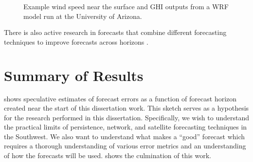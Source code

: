 \begin{figure}[htb]
\hspace{-.5em}
\caption[Wind speed and GHI output from UA-WRF]{Example wind speed
  near the surface and GHI outputs from a WRF model run at the
  University of Arizona.}
\label{fig:wrf}
\end{figure}

There is also active research in forecasts that combine
different forecasting techniques to improve forecasts across horizons
\citep{Lu2015}.


\section{Summary of Results}
\label{sec:dissummary}

 shows speculative estimates of forecast errors
as a function of forecast horizon created near the start of this
dissertation work.
This sketch serves as a hypothesis for the research performed in this
dissertation.
Specifically, we wish to understand the practical limits of
persistence, network, and satellite forecasting techniques in the
Southwest.
We also want to understand what makes a ``good'' forecast which
requires a thorough understanding of various error metrics and an
understanding of how the forecasts will be used.
 shows the culmination of this work.

